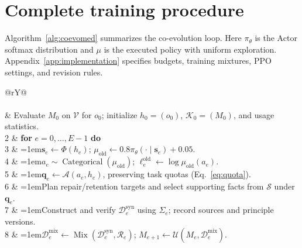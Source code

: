 \clearpage
\section{Complete training procedure}
\label{app:algorithm}

Algorithm~\ref{alg:coevomed} summarizes the co-evolution loop. Here $\pi_\theta$ is the Actor softmax distribution and $\mu$ is the executed policy with uniform exploration. Appendix~\ref{app:implementation} specifies budgets, training mixtures, PPO settings, and revision rules.

\begin{algorithm}[H]
\small
\setlength{\tabcolsep}{4pt}
\renewcommand{\arraystretch}{1.08}
\begin{tabularx}{\linewidth}{@{}rY@{}}
\toprule
{}\\
\\
 & Evaluate $M_0$ on $\mathcal V$ for $o_0$; initialize $h_0=(o_0)$, $\mathcal K_0=(M_0)$, and usage statistics.\\
2 & \textbf{for} $e=0,\ldots,E-1$ \textbf{do}\\
3 & \hangindent=1em\quad $\mathbf{s}_e\leftarrow\Phi(h_e)$; $\mu_{\mathrm{old}}\leftarrow0.8\pi_\theta(\cdot\mid\mathbf{s}_e)+0.05$.\\
4 & \hangindent=1em\quad $a_e\sim\operatorname{Categorical}(\mu_{\mathrm{old}})$; $\ell_e^{\mathrm{old}}\leftarrow\log\mu_{\mathrm{old}}(a_e)$.\\
5 & \hangindent=1em\quad $\boldsymbol q_e\leftarrow\mathcal A(a_e,h_e)$, preserving task quotas (Eq.~\ref{eq:quota}).\\
6 & \hangindent=1em\quad Plan repair/retention targets and select supporting facts from $\mathcal S$ under $\boldsymbol q_e$.\\
7 & \hangindent=1em\quad Construct and verify $\mathcal D_e^{\mathrm{syn}}$ using $\Sigma_e$; record sources and principle versions.\\
8 & \hangindent=1em\quad $\mathcal D_e^{\mathrm{mix}}\leftarrow\operatorname{Mix}(\mathcal D_e^{\mathrm{syn}},\mathcal R_e)$; $M_{e+1}\leftarrow\mathcal U(M_e,\mathcal D_e^{\mathrm{mix}})$.\\

\end{tabularx}
\end{algorithm}
